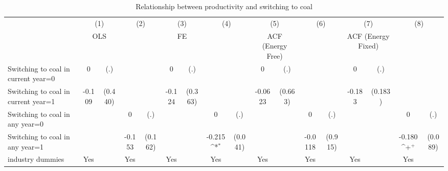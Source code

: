 \begin{table}[htbp]\centering
\def\sym#1{\ifmmode^{#1}\else\(^{#1}\)\fi}
\caption{Relationship between productivity and switching to coal}
\begin{tabular}{l*{8}{cc}}
\toprule
                    &\multicolumn{2}{c}{(1)}           &\multicolumn{2}{c}{(2)}           &\multicolumn{2}{c}{(3)}           &\multicolumn{2}{c}{(4)}           &\multicolumn{2}{c}{(5)}           &\multicolumn{2}{c}{(6)}           &\multicolumn{2}{c}{(7)}           &\multicolumn{2}{c}{(8)}           \\
                    &\multicolumn{2}{c}{OLS}           &\multicolumn{2}{c}{}              &\multicolumn{2}{c}{FE}            &\multicolumn{2}{c}{}              &\multicolumn{2}{c}{ACF (Energy Free)}&\multicolumn{2}{c}{}              &\multicolumn{2}{c}{ACF (Energy Fixed)}&\multicolumn{2}{c}{}              \\
\midrule
Switching to coal in current year=0&           0         &         (.)&                     &            &           0         &         (.)&                     &            &           0         &         (.)&                     &            &           0         &         (.)&                     &            \\
Switching to coal in current year=1&      -0.109         &     (0.440)&                     &            &      -0.124         &     (0.363)&                     &            &     -0.0623         &     (0.663)&                     &            &      -0.183         &     (0.183)&                     &            \\
Switching to coal in any year=0&                     &            &           0         &         (.)&                     &            &           0         &         (.)&                     &            &           0         &         (.)&                     &            &           0         &         (.)\\
Switching to coal in any year=1&                     &            &      -0.153         &     (0.162)&                     &            &      -0.215\sym{*}  &     (0.041)&                     &            &     -0.0118         &     (0.915)&                     &            &      -0.180\sym{+}  &     (0.089)\\
industry dummies    &         Yes         &            &         Yes         &            &         Yes         &            &         Yes         &            &         Yes         &            &         Yes         &            &         Yes         &            &         Yes         &            \\

\end{tabular}
\end{table}
